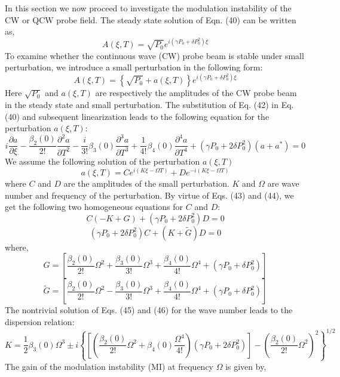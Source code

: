 \documentclass[12pt,a4paper]{article}
\begin{document}
In this section we now proceed to investigate the modulation instability of the CW or QCW probe field. The steady state solution of Eqn. (40) can be written as,
\begin{equation}
A(\xi, T) = \sqrt{P_0} e^{i (\gamma P_0 + \delta P_0^2) \xi}
\tag{41}
\end{equation}
To examine whether the continuous wave (CW) probe beam is stable under small perturbation, we introduce a small perturbation in the following form:
\begin{equation}
A(\xi, T) = \left\{ \sqrt{P_0} + a(\xi, T) \right\} e^{i (\gamma P_0 + \delta P_0^2) \xi}
\tag{42}
\end{equation}
Here \( \sqrt{P_0} \) and \( a(\xi, T) \) are respectively the amplitudes of the CW probe beam in the steady state and small perturbation. The substitution of Eq. (42) in Eq. (40) and subsequent linearization leads to the following equation for the perturbation \( a(\xi, T) \):
\begin{equation}
i \frac{\partial a}{\partial \xi} - \frac{\beta_2(0)}{2!} \frac{\partial^2 a}{\partial T^2} - \frac{i}{3!} \beta_3(0) \frac{\partial^3 a}{\partial T^3} + \frac{1}{4!} \beta_4(0) \frac{\partial^4 a}{\partial T^4} + (\gamma P_0 + 2 \delta P_0^2)(a + a^*) = 0
\tag{43}
\end{equation}
We assume the following solution of the perturbation \( a(\xi, T) \)
\begin{equation}
a(\xi, T) = C e^{i(K \xi - \Omega T)} + D e^{-i(K \xi - \Omega T)}
\tag{44}
\end{equation}
where \( C \) and \( D \) are the amplitudes of the small perturbation. \( K \) and \( \Omega \) are wave number and frequency of the perturbation. By virtue of Eqs. (43) and (44), we get the following two homogeneous equations for \( C \) and \( D \):
\begin{equation}
C(-K + G) + (\gamma P_0 + 2 \delta P_0^2) D = 0
\tag{45}
\end{equation}
\begin{equation}
(\gamma P_0 + 2 \delta P_0^2) C + (K + \tilde{G}) D = 0
\tag{46}
\end{equation}
where,
\[
G = \left[ \frac{\beta_2(0)}{2!} \Omega^2 + \frac{\beta_3(0)}{3!} \Omega^3 + \frac{\beta_4(0)}{4!} \Omega^4 + (\gamma P_0 + \delta P_0^2) \right]
\]
\[
\tilde{G} = \left[ \frac{\beta_2(0)}{2!} \Omega^2 - \frac{\beta_3(0)}{3!} \Omega^3 + \frac{\beta_4(0)}{4!} \Omega^4 + (\gamma P_0 + \delta P_0^2) \right]
\]
The nontrivial solution of Eqs. (45) and (46) for the wave number leads to the dispersion relation:
\begin{equation}
K = \frac{1}{2} \beta_3(0) \Omega^3 \pm i \left\{ \left[ \left( \frac{\beta_2(0)}{2!} \Omega^2 + \beta_4(0) \frac{\Omega^4}{4!} \right) \left( \gamma P_0 + 2 \delta P_0^2 \right) \right] - \left( \frac{\beta_2(0)}{2!} \Omega^2 \right)^2 \right\}^{1/2}
\tag{47}
\end{equation}
The gain of the modulation instability (MI) at frequency \( \Omega \) is given by,
\end{document}
